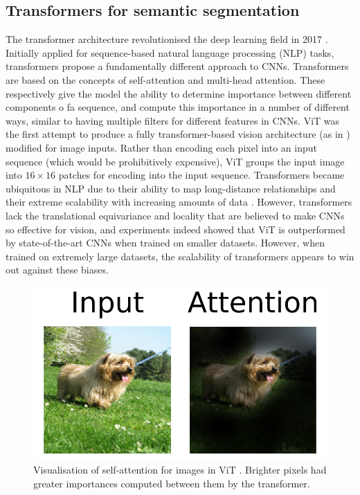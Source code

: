 \documentclass[a4paper,12pt]{report}
\begin{document}
\subsection{Transformers for semantic segmentation}

The transformer architecture revolutionised the deep learning field in 2017 \cite{vaswani_attention_2017}. Initially applied for sequence-based natural language processing (NLP) tasks, transformers propose a fundamentally different approach to CNNs. Transformers are based on the concepts of self-attention and multi-head attention. These respectively give the model the ability to determine importance between different components o fa sequence, and compute this importance in a number of different ways, similar to having multiple filters for different features in CNNs. ViT \cite{dosovitskiy_image_2021} was the first attempt to produce a fully transformer-based vision architecture (as in \cite{vaswani_attention_2017}) modified for image inputs. Rather than encoding each pixel into an input sequence (which would be prohibitively expensive), ViT groups the input image into $16 \times 16$ patches for encoding into the input sequence. Transformers became ubiquitous in NLP due to their ability to map long-distance relationships and their extreme scalability with increasing amounts of data \cite{devlin_bert_2019} \cite{radford_language_2019}. However, transformers lack the translational equivariance and locality that are believed to make CNNs so effective for vision, and experiments indeed showed that ViT is outperformed by state-of-the-art CNNs when trained on smaller datasets. However, when trained on extremely large datasets, the scalability of transformers appears to win out against these biases.

\begin{figure}[h]
    \centering
    \includegraphics[scale=0.5]{res/vit-attention.png}
    \caption{Visualisation of self-attention for images in ViT \cite{dosovitskiy_image_2021}. Brighter pixels had greater importances computed between them by the transformer.}
    \label{fig:vit_attention}
\end{figure}
\end{document}
